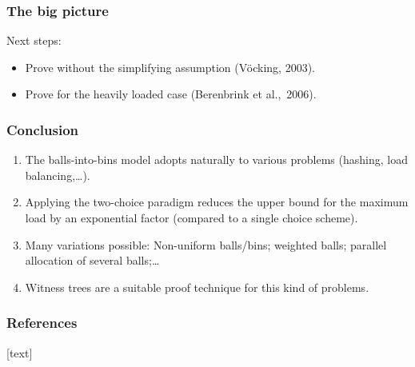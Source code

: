 \documentclass[serif,professionalfonts]{beamer}
\begin{document}
\begin{frame}
\frametitle{The big picture}
\theoremVocking
\assumptionOne
\medskip 
Next steps:
\begin{itemize}
\item Prove \alert{without} the simplifying assumption (V\"ocking, 2003).
\item Prove for the \alert{heavily loaded} case (Berenbrink et al.,~2006).
\end{itemize}
\end{frame}

\begin{frame}
\frametitle{Conclusion}
\begin{enumerate}
\item The balls-into-bins model \alert{adopts naturally} to various problems (hashing, load balancing,\dots).
\item Applying the two-choice paradigm reduces the upper bound for the maximum load by an \alert{exponential factor} (compared to a single choice scheme).
\item \alert{Many variations} possible: Non-uniform balls/bins; weighted balls; parallel allocation of several balls;\dots
\item \alert{Witness trees} are a suitable proof technique for this kind of problems.
\end{enumerate}
\end{frame}

\begin{frame}[shrink]
\frametitle<presentation>{References}    

\nocite{VOC03}
\nocite{ABKU99}
\nocite{RS98}
\nocite{BCSV06}
\nocite{capocelli1990generalized}
[text]

\end{frame} 	
\end{document}
